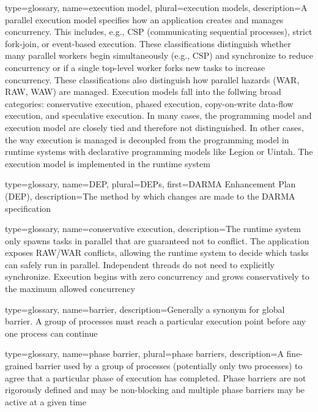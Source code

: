 {
  type=glossary,
  name={execution model},
  plural={execution models},
  description={A parallel execution model specifies how an application creates
    and manages \gls{concurrency}. This includes, e.g., \gls{CSP} (communicating
        sequential processes), strict \gls{fork-join}, or \gls{event-based}
      execution.  These classifications distinguish whether many parallel
      workers begin simultaneously (e.g., \gls{CSP}) and synchronize to reduce
      \gls{concurrency}
      or if a single top-level worker forks new tasks to increase \gls{concurrency}.
      These classifications also distinguish how parallel hazards (\gls{WAR},
          \gls{RAW}, \gls{WAW}) are managed. Execution models fall into the
      follwing broad categories: \gls{conservative execution}, \gls{phased
        execution}, \gls{copy-on-write data-flow execution}, and
        \gls{speculative execution}.
    In many cases, the \gls{programming model} and execution model are closely tied and
      therefore not distinguished. In other cases, the way execution is managed is decoupled from
      the \gls{programming model} in \glspl{runtime system} with
      \gls{declarative} \glspl{programming model} like Legion or Uintah. The execution model is implemented in the
      \gls{runtime system}
  }
}

{
  type=glossary,
  name={DEP},
  plural={DEPs},
  first={\gls{DARMA} Enhancement Plan (DEP)},
  description={The method by which changes are made to the \gls{DARMA}
    specification}
}


{
  type=glossary,
  name={conservative execution},
  description={The \gls{runtime system} only spawns tasks in parallel that are guaranteed not to conflict.  
The application exposes \gls{RAW}/\gls{WAR} conflicts, allowing the
  \gls{runtime system} to decide which tasks can safely 
run in parallel.  Independent threads do not need to explicitly synchronize.
Execution begins with zero \gls{concurrency}
and grows conservatively to the maximum allowed \gls{concurrency}}
}

{
  type=glossary,
  name={barrier},
  description={Generally a synonym for global barrier. A group of processes must reach a particular execution point
  before any one process can continue}
}

{
  type=glossary,
  name={phase barrier},
  plural={phase barriers},
  description={A fine-grained barrier used by a group of processes (potentially only two processes)
    to agree that a particular phase of execution has completed. Phase barriers are not rigorously defined and
    may be non-blocking and multiple phase barriers may be active at a given time}
}

